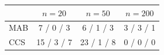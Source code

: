 \begin{tabular}{lccc}
\toprule
& $n=20$ & $n=50$ & $n=200$ \\
\midrule
MAB & 7 / 0 / 3 & 6 / 1 / 3 & 3 / 3 / 1 \\
CCS & 15 / 3 / 7 & 23 / 1 / 8 & 0 / 0 / 0 \\
\bottomrule
\end{tabular}
